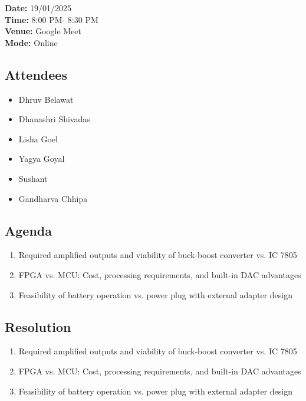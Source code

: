 \documentclass[12pt,a4paper]{article}
\begin{document}
\noindent
\textbf{Date:} 19/01/2025 \\
\textbf{Time:} 8:00 PM- 8:30 PM \\
\textbf{Venue:} Google Meet \\
\textbf{Mode:} Online \\

\vspace{0.3cm}


\subsection*{Attendees}
\begin{itemize}
    \item Dhruv Belawat
    \item Dhanashri Shivadas
    \item Lisha Goel
    \item Yagya Goyal
    \item Sushant 
    \item Gandharva Chhipa
\end{itemize}


\subsection*{Agenda}
\begin{enumerate}
  \item Required amplified outputs and viability of buck-boost converter vs. IC 7805
        \item FPGA vs. MCU: Cost, processing requirements, and built-in DAC advantages
        \item Feasibility of battery operation vs. power plug with external adapter design
\end{enumerate}

\subsection*{Resolution}
\begin{enumerate}
  \item Required amplified outputs and viability of buck-boost converter vs. IC 7805
        \item FPGA vs. MCU: Cost, processing requirements, and built-in DAC advantages
        \item Feasibility of battery operation vs. power plug with external adapter design
\end{enumerate}
\end{document}
